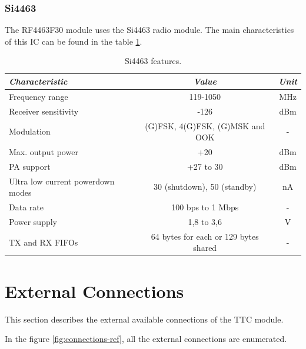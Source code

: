 \subsubsection{Si4463}

The RF4463F30 module uses the Si4463 radio module. The main characteristics of this IC can be found in the table \ref{tab:si4463-info}.

\begin{table}[!h]
	\begin{center}
		\begin{tabular}{lcc}
			\toprule[1.5pt]
			\textit{Characteristic} & \textit{Value} & \textit{Unit} \\
			\midrule
			Frequency range & 119-1050 & MHz \\
			Receiver sensitivity & -126 & dBm \\
			Modulation & (G)FSK, 4(G)FSK, (G)MSK and OOK & - \\
			Max. output power & +20 & dBm \\
			PA support & +27 to 30 & dBm \\
			Ultra low current powerdown modes & 30 (shutdown), 50 (standby) & nA \\
			Data rate & 100 bps to 1 Mbps & - \\
			Power supply & 1,8 to 3,6 & V \\
			TX and RX FIFOs & 64 bytes for each or 129 bytes shared & - \\
			\bottomrule[1.5pt]
		\end{tabular}
		\caption{Si4463 features.}
		\label{tab:si4463-info}
	\end{center}
\end{table}

\section{External Connections}

This section describes the external available connections of the TTC module.

In the figure \ref{fig:connections-ref}, all the external connections are enumerated.

